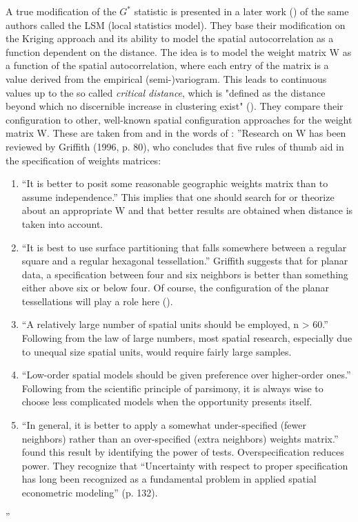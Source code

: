 \documentclass[a4paper,UKenglish]{lipics-v2016}
\begin{document}
A true modification of the $G^*$ statistic is presented in a later work (\cite{getis2010constructing}) of the same authors called the LSM (local statistics model). They base their modification on the Kriging approach and its ability to model the spatial autocorrelation as a function dependent on the distance. The idea is to model the weight matrix W as a function of the spatial autocorrelation, where each entry of the matrix is a value derived from the empirical  (semi-)variogram. This leads to continuous values up to the so called \emph{critical distance}, which is "defined as the distance beyond which no discernible increase in clustering exist" (\cite{getis2010constructing}). They compare their configuration to other, well-known spatial configuration approaches for the weight matrix W. These are taken from \cite{griffith1996some} and in the words of \cite{getis2010constructing}:
''Research on W has been reviewed by Griffith (1996, p. 80), who concludes that five rules of thumb aid in the specification of weights matrices: 
\begin{enumerate}
\item “It is better to posit some reasonable geographic weights matrix than to assume independence.” This implies that one should search for or theorize about an appropriate W and that better results are obtained when distance is taken into account.
\item “It is best to use surface partitioning that falls somewhere between a regular square and a regular hexagonal tessellation.” Griffith suggests that for planar data, a specification between four and six neighbors is better than something either above six or below four. Of course, the configuration of the planar tessellations will play a role here (\cite{boots2000global}).
\item “A relatively large number of spatial units should be employed, n > 60.” Following from the law of large numbers, most spatial research, especially due to unequal size spatial units, would require fairly large samples.
\item “Low-order spatial models should be given preference over higher-order ones.” Following from the scientific principle of parsimony, it is always wise to choose less complicated models when the opportunity presents itself.
\item “In general, it is better to apply a somewhat under-specified (fewer neighbors) rather than an over-specified (extra neighbors) weights matrix.” \cite{florax1995impacts} found this result by identifying the power of tests. Overspecification reduces power. They recognize that “Uncertainty with respect to proper specification has long been recognized as a fundamental problem in applied spatial econometric modeling” (p. 132).
\end{enumerate}
''
\end{document}

